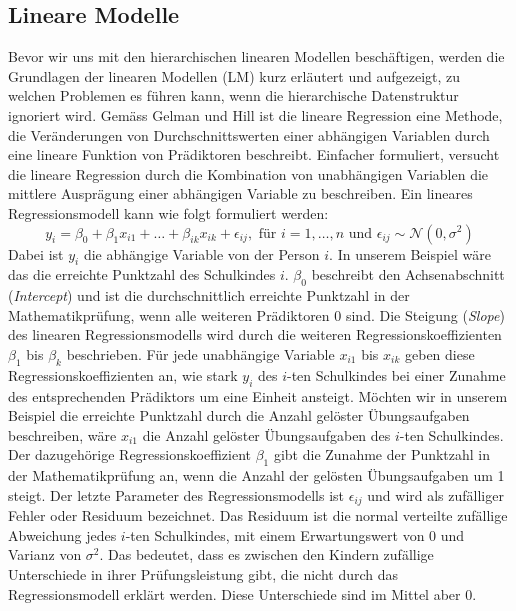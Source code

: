 \documentclass[12pt]{article}\usepackage[]{graphicx}\usepackage[]{color}
\begin{document}
\subsection{Lineare Modelle} \label{section:linear_model}
Bevor wir uns mit den hierarchischen linearen Modellen beschäftigen, werden die Grundlagen der linearen Modellen (LM) kurz erläutert und aufgezeigt, zu welchen Problemen es führen kann, wenn die hierarchische Datenstruktur ignoriert wird. Gemäss Gelman und Hill \citeyearpar{andrew_data} ist die lineare Regression eine Methode, die Veränderungen von Durchschnittswerten einer abhängigen Variablen durch eine lineare Funktion von Prädiktoren beschreibt. Einfacher formuliert, versucht die lineare Regression durch die Kombination von unabhängigen Variablen die mittlere Ausprägung einer abhängigen Variable zu beschreiben. Ein lineares Regressionsmodell kann wie folgt formuliert werden:
\begin{equation} \label{eq:ols_model}
y_{i} = \beta_{0} + \beta_{1}x_{i1} + \dots + \beta_{ik}x_{ik} + \epsilon_{ij}, \text{ für } i = 1, \dots, n \text{ und } \epsilon_{ij} \sim \mathcal{N}(0,\sigma^{2})
\end{equation}
Dabei ist $y_{i}$ die abhängige Variable von der Person $i$. In unserem Beispiel wäre das die erreichte Punktzahl des Schulkindes $i$. $\beta_0$ beschreibt den Achsenabschnitt (\textit{Intercept}) und ist die durchschnittlich erreichte Punktzahl in der Mathematikprüfung, wenn alle weiteren Prädiktoren 0 sind. Die Steigung (\textit{Slope}) des linearen Regressionsmodells wird durch die weiteren Regressionskoeffizienten $\beta_{1}$ bis $\beta_{k}$ beschrieben. Für jede unabhängige Variable $x_{i1}$ bis $x_{ik}$ geben diese Regressionskoeffizienten an, wie stark $y_{i}$ des $i$-ten Schulkindes bei einer Zunahme des entsprechenden Prädiktors um eine Einheit ansteigt. Möchten wir in unserem Beispiel die erreichte Punktzahl durch die Anzahl gelöster Übungsaufgaben beschreiben, wäre $x_{i1}$ die Anzahl gelöster Übungsaufgaben des $i$-ten Schulkindes. Der dazugehörige Regressionskoeffizient $\beta_{1}$ gibt die Zunahme der Punktzahl in der Mathematikprüfung an, wenn die Anzahl der gelösten Übungsaufgaben um 1 steigt. Der letzte Parameter des Regressionsmodells ist $\epsilon_{ij}$ und wird als zufälliger Fehler oder Residuum bezeichnet. Das Residuum ist die normal verteilte zufällige Abweichung jedes $i$-ten Schulkindes, mit einem Erwartungswert von 0 und Varianz von $\sigma^{2}$. Das bedeutet, dass es zwischen den Kindern zufällige Unterschiede in ihrer Prüfungsleistung gibt, die nicht durch das Regressionsmodell erklärt werden. Diese Unterschiede sind im Mittel aber 0. 
\end{document}

